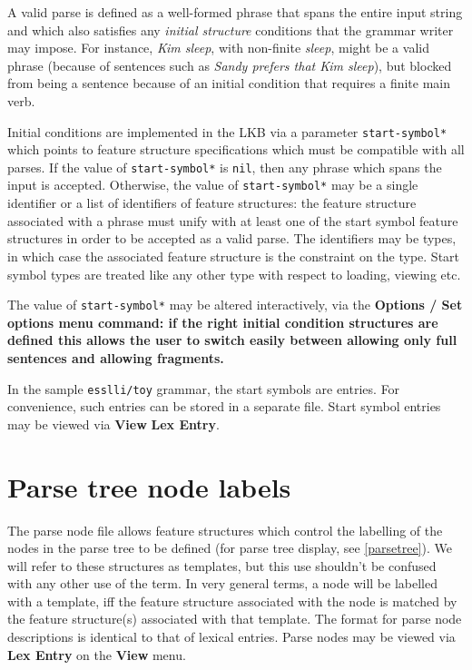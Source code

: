 \documentclass[12pt]{report}
\newcommand{\filename}[1]{{\tt #1}}
\newcommand{\lkbparam}[1]{{\tt #1}}
\newcommand{\lkbmenucommand}{\bf}
\newcommand{\newterm}[1]{{\it #1}}
\begin{document}
A valid parse is defined as a well-formed phrase that spans the entire
input string and which also satisfies any \newterm{initial structure} 
conditions
that the grammar writer may impose.  For instance,  {\it Kim sleep},
with non-finite {\it sleep},
might be a valid phrase (because
of sentences such as {\it Sandy prefers that Kim sleep}), but blocked
from being a sentence because of an initial condition that requires a finite
main verb.  

Initial conditions are implemented in the LKB via a
parameter \lkbparam{*start-symbol*} 
which points to feature structure specifications
which must be compatible with all parses.  If the value of 
\lkbparam{*start-symbol*}
is {\tt nil}, then any phrase which spans the input is accepted.
Otherwise,
the value of \lkbparam{*start-symbol*}
may be a single identifier or a list of identifiers of feature
structures: the feature structure associated with a phrase must unify
with at least one of the start symbol feature structures in order
to be accepted as a valid parse.  The identifiers may be types, in which
case the associated feature structure is the constraint on the
type.  Start symbol 
types are treated like any other type with respect to loading,
viewing etc.
 
The value of \lkbparam{*start-symbol*} may be altered interactively,
via the \lkbmenucommand{Options} / \lkbmenucommand{Set options} 
menu command: if the right initial condition structures are defined
this allows the user to switch easily between 
allowing only full sentences and allowing fragments.

In the sample \filename{esslli/toy} grammar, the start symbols are 
entries.  For convenience, such entries
can be stored in a separate file.
Start symbol entries may be viewed via {\lkbmenucommand View} 
{\lkbmenucommand Lex Entry}.

\section{Parse tree node labels}
\label{treenodes}

The parse node file allows feature structures which control the
labelling of the nodes in the
parse tree to be defined (for parse tree display, see \ref{parsetree}).
We will refer to these structures as templates, but this use 
shouldn't be confused with any other use of the term.
In very general terms,
a node will be labelled with a template, iff the feature
structure associated with the node is matched by the feature
structure(s) associated with that template.
The format for parse node descriptions is
identical to that of lexical entries.  Parse nodes may be viewed via 
{\lkbmenucommand Lex Entry} on the {\lkbmenucommand View} menu.
\end{document}
